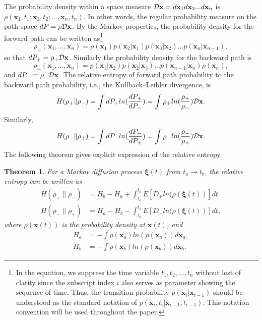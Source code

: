 \documentclass[%
 aip, 
 amsmath,amssymb,amsthm,
 nofootinbib,
 reprint,
]{revtex4-1}
\newtheorem{theorem}{Theorem}
\begin{document}
The probability density within a space measure ${\cal{D}}\mathbf{x} = d\mathbf{x}_1d\mathbf{x}_2...d\mathbf{x}_n$ is $\rho(\mathbf{x}_1, t_1; \mathbf{x}_2, t_2; ..., \mathbf{x}_n, t_n)$.  In other words, the regular probability measure on the path space $dP = \rho{\cal{D}}\mathbf{x}$. By the Markov properties, the probability density for the forward path can be written as\footnote{In the equation, we suppress the time variable $t_1, t_2, ..., t_n$ without lost of clarity since the subscript index $i$ also serves as parameter showing the sequence of time. Thus, the transition probability $p(\mathbf{x}_i|\mathbf{x}_{i-1})$ should be understood as the standard notation of $p(\mathbf{x}_i, t_i|\mathbf{x}_{i-1}, t_{i-1})$. This notation convention will be used throughout the paper.}
\begin{equation}
    \label{fwdp}
    \rho_+(\mathbf{x}_1, ..., \mathbf{x}_n)=\rho(\mathbf{x}_1)p(\mathbf{x}_2|\mathbf{x}_1)p(\mathbf{x}_3|\mathbf{x}_2)...p(\mathbf{x}_n|\mathbf{x}_{n-1}),
\end{equation}
so that $dP_+ = \rho_+{\cal{D}}\mathbf{x}$. Similarly the probability density for the backward  path is
\begin{equation}
    \label{bwdp}
    \rho_-(\mathbf{x}_1, ..., \mathbf{x}_n)=p(\mathbf{x}_1|\mathbf{x}_2)p(\mathbf{x}_2|\mathbf{x}_3)...p(\mathbf{x}_{n-1}|\mathbf{x}_{n})\rho(\mathbf{x}_n),
\end{equation}
and $dP_- = \rho_-{\cal{D}}\mathbf{x}$. The relative entropy of forward path probability to the backward path probability, i.e., the  Kullback–Leibler divergence, is
\begin{equation}
    \label{fwdH}
    H(\rho_+\|\rho_-) = \int dP_+ ln(\frac{dP_+}{dP_-}) = \int \rho_+ln(\frac{\rho_+}{\rho_-}){\cal{D}}\mathbf{x}.
\end{equation}
Similarly,
\begin{equation}
    \label{bwdH}
    H(\rho_-\|\rho_+) = \int dP_- ln(\frac{dP_-}{dP_+}) = \int \rho_-ln(\frac{\rho_-}{\rho_+}){\cal{D}}\mathbf{x}.
\end{equation}
The following theorem gives explicit expression of the relative entropy.
\begin{theorem} 
\label{relativeH}
For a Markov diffusion process $\mathbf{\xi}(t)$ from $t_a\to t_b$, the relative entropy can be written as
\begin{equation}
\label{theo1}
\begin{split}
     H(\rho_+\|\rho_-) &= H_b - H_a + \int_{t_a}^{t_b} E[D_+ln(\rho(\mathbf{\xi}(t))]dt \\
     H(\rho_-\|\rho_+) &= H_a - H_b - \int_{t_a}^{t_b} E[D_-ln(\rho(\mathbf{\xi}(t))]dt, 
\end{split}
\end{equation}     
where $\rho(\mathbf{x}(t))$ is the probability density at $\mathbf{x}(t)$, and 
\begin{equation}
\begin{split}
    H_a &= -\int \rho(\mathbf{x}_a)ln(\rho(\mathbf{x}_a))d\mathbf{x}_a,\\ H_b &= -\int \rho(\mathbf{x}_b)ln(\rho(\mathbf{x}_b))d\mathbf{x}_b.
\end{split}
\end{equation}
\end{theorem}
\end{document}
